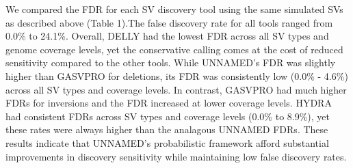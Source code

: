 \documentclass[11pt]{article}
\begin{document}
We compared the FDR for each SV discovery tool using the same simulated
SVs as described above (Table 1).The false discovery rate for all tools ranged 
from 0.0\% to 24.1\%. Overall, DELLY had the lowest FDR across all SV types
and genome coverage levels, yet the conservative calling comes at the cost of
reduced sensitivity compared to the other tools. While UNNAMED's FDR was 
slightly higher than GASVPRO for deletions, its FDR was consistently 
low (0.0\% - 4.6\%) across all SV types and coverage levels. In contrast, 
GASVPRO had much higher FDRs for inversions and
the FDR increased at lower coverage levels.  HYDRA had consistent FDRs across
SV types and coverage levels (0.0\% to 8.9\%), yet these rates were always 
higher than the analagous UNNAMED FDRs. These results indicate that UNNAMED's
probabilistic framework afford substantial improvements in discovery
sensitivity while maintaining low false discovery rates.
\end{document}
